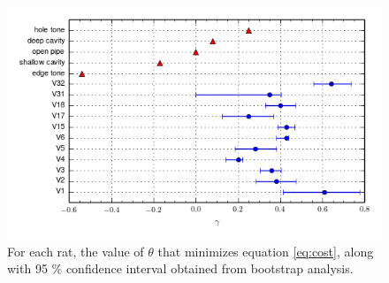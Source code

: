 \documentclass[twocolumn, prl]{revtex4}
\begin{document}
\begin{figure}
\begin{center}
\includegraphics[width=\columnwidth]{theta_error.png}
\caption{\label{fig:theta_error}For each rat, the value of $\theta$ that minimizes equation \ref{eq:cost}, along with 95 \% confidence interval obtained from bootstrap analysis.} \end{center}
\end{figure}


\end{document}
